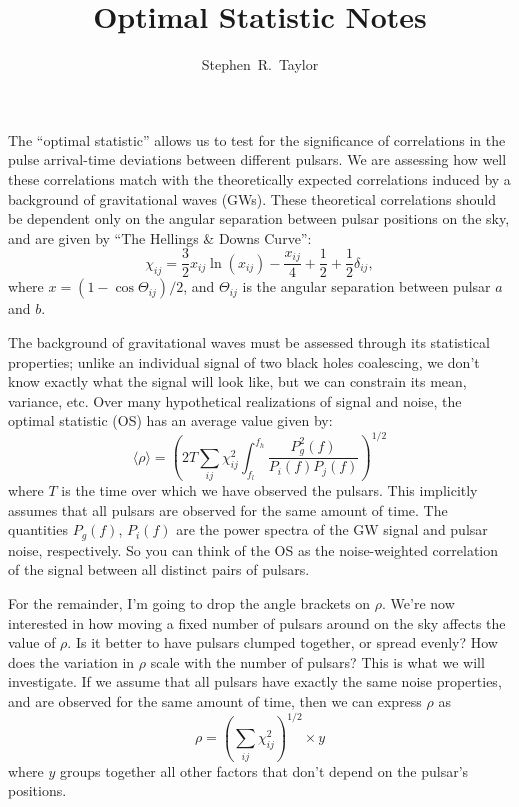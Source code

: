 \documentclass[12pt,letterpaper]{article}
\begin{document}
\title{Optimal Statistic Notes}
\author{Stephen~R.~Taylor}
\maketitle

The ``optimal statistic'' allows us to test for the significance of correlations in the pulse arrival-time deviations between different pulsars. We are assessing how well these correlations match with the theoretically expected correlations induced by a background of gravitational waves (GWs). These theoretical correlations should be dependent only on the angular separation between pulsar positions on the sky, and are given by ``The Hellings \& Downs Curve'':
%
\begin{equation}
\chi_{ij} = \frac{3}{2}x_{ij}\ln(x_{ij}) - \frac{x_{ij}}{4} + \frac{1}{2} + \frac{1}{2}\delta_{ij},
\end{equation}
%
where $x = (1-\cos\Theta_{ij})/2$, and $\Theta_{ij}$ is the angular separation between pulsar $a$ and $b$.

The background of gravitational waves must be assessed through its statistical properties; unlike an individual signal of two black holes coalescing, we don't know exactly what the signal will look like, but we can constrain its mean, variance, etc. Over many hypothetical realizations of signal and noise, the optimal statistic (OS) has an average value given by:
%
\begin{equation}
\langle \rho \rangle = \left( 2T\sum_{ij} \chi_{ij}^2 \int_{f_l}^{f_h} \frac{P_g^2(f)}{P_i(f)P_j(f)} \right)^{1/2}
\end{equation}
%
where $T$ is the time over which we have observed the pulsars. This implicitly assumes that all pulsars are observed for the same amount of time. The quantities $P_g(f)$, $P_i(f)$ are the power spectra of the GW signal and pulsar noise, respectively. So you can think of the OS as the noise-weighted correlation of the signal between all distinct pairs of pulsars.

For the remainder, I'm going to drop the angle brackets on $\rho$. We're now interested in how moving a fixed number of pulsars around on the sky affects the value of $\rho$. Is it better to have pulsars clumped together, or spread evenly? How does the variation in $\rho$ scale with the number of pulsars? This is what we will investigate. If we assume that all pulsars have exactly the same noise properties, and are observed for the same amount of time, then we can express $\rho$ as
%
\begin{equation}
\rho = \left( \sum_{ij} \chi_{ij}^2  \right)^{1/2} \times y
\end{equation}
%
where $y$ groups together all other factors that don't depend on the pulsar's positions. 
\end{document}
